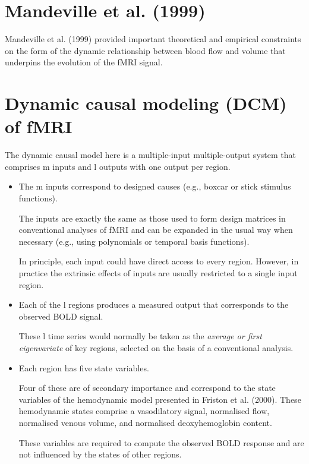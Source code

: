 \section{Mandeville et al. (1999)}

Mandeville et al. (1999) provided important theoretical and empirical
constraints on the form of the dynamic relationship between blood flow and
volume that underpins the evolution of the fMRI signal.


\section{Dynamic causal modeling (DCM) of fMRI}

The dynamic causal model here is a multiple-input multiple-output system that
comprises m inputs and l outputs with one output per region.
\begin{itemize}
  
  \item  The m inputs correspond to designed causes (e.g., boxcar or stick
  stimulus functions).

The inputs are exactly the same as those used to form design
matrices in conventional analyses of fMRI and can be expanded
in the usual way when necessary (e.g., using polynomials
or temporal basis functions). 

In principle, each input could have direct access to every region.
However, in practice the extrinsic effects of inputs are usually restricted to a
single input region.

  \item  Each of the l regions produces a measured output that corresponds to
  the observed BOLD signal.


These l time series would normally be taken as the
{\it average or first eigenvariate} of key regions, selected on the
basis of a conventional analysis.

  \item Each region has five state variables. 
  
  Four of these are of secondary importance and correspond to the state
  variables of the hemodynamic model presented in Friston et al. (2000).
  These hemodynamic states comprise a vasodilatory signal, normalised flow,
  normalised venous volume, and normalised deoxyhemoglobin content. 

  These variables are required to compute the observed BOLD response and are not
  influenced by the states of other regions.
  

\end{itemize}



